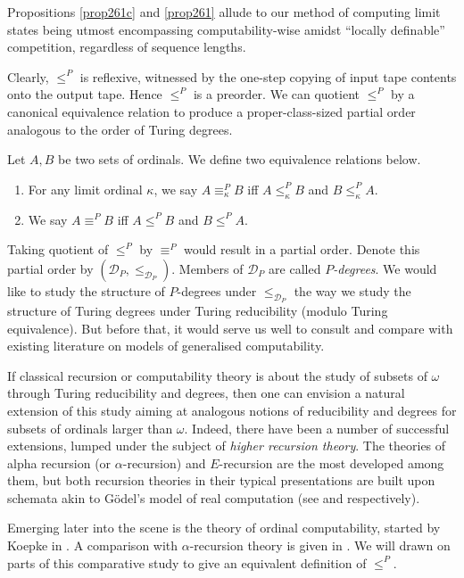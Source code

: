 \documentclass[12pt]{article}
\numberwithin{equation}{section}
\begin{document}
Propositions \ref{prop261c} and \ref{prop261} allude to our method of computing limit states being utmost encompassing computability-wise amidst ``locally definable'' competition, regardless of sequence lengths.

Clearly, $\leq^P$ is reflexive, witnessed by the one-step copying of input tape contents onto the output tape. Hence $\leq^P$ is a preorder. We can quotient $\leq^P$ by a canonical equivalence relation to produce a proper-class-sized partial order analogous to the order of Turing degrees.

\begin{defi}
Let $A, B$ be two sets of ordinals. We define two equivalence relations below.
\begin{enumerate}[label=(\arabic*)]
    \item For any limit ordinal $\kappa$, we say $A \equiv^P_{\kappa} B$ iff $A \leq^P_{\kappa} B$ and $B \leq^P_{\kappa} A$.
    \item We say $A \equiv^P B$ iff $A \leq^P B$ and $B \leq^P A$.
\end{enumerate}
\end{defi}

Taking quotient of $\leq^P$ by $\equiv^P$ would result in a partial order. Denote this partial order by $(\mathcal{D}_P, \leq_{\mathcal{D}_P})$. Members of $\mathcal{D}_P$ are called $P$\emph{-degrees}. We would like to study the structure of $P$-degrees under $\leq_{\mathcal{D}_P}$ the way we study the structure of Turing degrees under Turing reducibility (modulo Turing equivalence). But before that, it would serve us well to consult and compare with existing literature on models of generalised computability. 

If classical recursion or computability theory is about the study of subsets of $\omega$ through Turing reducibility and degrees, then one can envision a natural extension of this study aiming at analogous notions of reducibility and degrees for subsets of ordinals larger than $\omega$. Indeed, there have been a number of successful extensions, lumped under the subject of \emph{higher recursion theory}. The theories of alpha recursion (or $\alpha$-recursion) and $E$-recursion are the most developed among them, but both recursion theories in their typical presentations are built upon schemata akin to G\"{o}del's model of real computation (see \cite{takeuti} and \cite{normann} respectively).

Emerging later into the scene is the theory of ordinal computability, started by Koepke in \cite{koepke1}. A comparison with $\alpha$-recursion theory is given in \cite{koepke2}. We will drawn on parts of this comparative study to give an equivalent definition of $\leq^P$.
\end{document}
